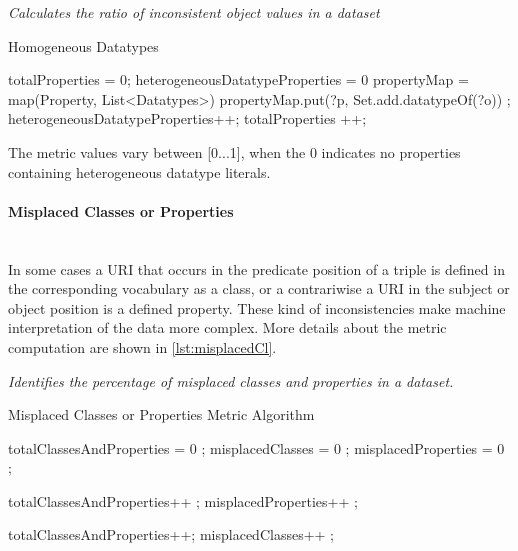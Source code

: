 \begin{mdframed}[style=metricdefinition]
\emph{Calculates the ratio of inconsistent object values in a dataset}
\end{mdframed}

\begin{algorithm}
\caption{Homogeneous Datatypes}\label{lst:heterogeneous}
\begin{algorithmic}[1]
\State totalProperties = 0;
\State heterogeneousDatatypeProperties = 0
\State  propertyMap = map(Property, List<Datatypes>)
\EndProcedure
{}
  propertyMap.put(?p, Set.add.datatypeOf(?o)) \EndIf;
\EndProcedure
{}
 heterogeneousDatatypeProperties++; 
\EndIf
totalProperties ++;
\EndFor
\EndProcedure
\end{algorithmic}
\end{algorithm}

The metric values vary between [0...1], when the 0 indicates no properties containing heterogeneous datatype literals.
  
\paragraph{Misplaced Classes or Properties}~\\
In some cases a URI that occurs in the predicate position of a triple is defined in the corresponding vocabulary as a class, or a contrariwise a URI in the subject or object position is a defined property.
These kind of inconsistencies make machine interpretation of the data more complex.
More details about the metric computation are shown in \ref{lst:misplacedCl}.

\begin{mdframed}[style=metricdefinition]
\emph{Identifies the percentage of misplaced classes and properties in a dataset.}
\end{mdframed}

\begin{algorithm}
\caption{Misplaced Classes or Properties Metric Algorithm}\label{lst:misplacedCl}
\begin{algorithmic}[1]
\State totalClassesAndProperties = 0 ;
\State misplacedClasses = 0 ;
\State misplacedProperties = 0 ;
\EndProcedure

 totalClassesAndProperties++ ;\EndIf 
{} misplacedProperties++ ; \EndIf 

 totalClassesAndProperties++; \EndIf  
{} misplacedClasses++ ; \EndIf 
{}
\EndProcedure
\end{algorithmic}
\end{algorithm}

